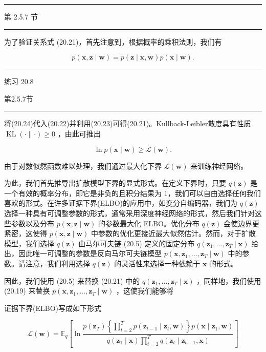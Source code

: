 \documentclass[10pt]{article}
\newcommand{\HRule}{\begin{center}\rule{0.9\linewidth}{0.2mm}\end{center}}
\begin{document}
\HRule

第 2.5.7 节

\HRule

为了验证关系式 (20.21)，首先注意到，根据概率的乘积法则，我们有

\[
p\left( {\mathbf{x},\mathbf{z} \mid  \mathbf{w}}\right)  = p\left( {\mathbf{z} \mid  \mathbf{x},\mathbf{w}}\right) p\left( {\mathbf{x} \mid  \mathbf{w}}\right) . \tag{20.24}
\]

\HRule

练习 20.8

第2.5.7节

\HRule

将(20.24)代入(20.22)并利用(20.23)可得(20.21)。Kullback-Leibler散度具有性质 \(\operatorname{KL}\left( {\cdot \parallel  \cdot  }\right)  \geq  0\) ，由此可推出

\[
\ln p\left( {\mathbf{x} \mid  \mathbf{w}}\right)  \geq  \mathcal{L}\left( \mathbf{w}\right) . \tag{20.25}
\]

由于对数似然函数难以处理，我们通过最大化下界 \(\mathcal{L}\left( \mathbf{w}\right)\) 来训练神经网络。

为此，我们首先推导出扩散模型下界的显式形式。在定义下界时，只要 \(q\left( \mathbf{z}\right)\) 是一个有效的概率分布，即它是非负的且积分结果为 1，我们可以自由选择任何我们喜欢的形式。在许多证据下界(ELBO)的应用中，如变分自编码器，我们为 \(q\left( \mathbf{z}\right)\) 选择一种具有可调整参数的形式，通常采用深度神经网络的形式，然后我们针对这些参数以及分布 \(p\left( {\mathbf{x},\mathbf{z} \mid  \mathbf{w}}\right)\) 的参数最大化 ELBO。优化分布 \(q\left( \mathbf{z}\right)\) 会使边界更紧密，这使得 \(p\left( {\mathbf{x},\mathbf{z} \mid  \mathbf{w}}\right)\) 中参数的优化更接近最大似然估计。然而，对于扩散模型，我们选择 \(q\left( \mathbf{z}\right)\) 由马尔可夫链 (20.5) 定义的固定分布 \(q\left( {{\mathbf{z}}_{1},\ldots ,{\mathbf{z}}_{T} \mid  \mathbf{x}}\right)\) 给出，因此唯一可调整的参数是反向马尔可夫链模型 \(p\left( {\mathbf{x},{\mathbf{z}}_{1},\ldots ,{\mathbf{z}}_{T} \mid  \mathbf{w}}\right)\) 中的参数。请注意，我们利用选择 \(q\left( \mathbf{z}\right)\) 的灵活性来选择一种依赖于 \(\mathbf{x}\) 的形式。

因此，我们使用 (20.5) 来替换 (20.21) 中的 \(q\left( {{\mathbf{z}}_{1},\ldots ,{\mathbf{z}}_{T} \mid  \mathbf{x}}\right)\) ，同样地，我们使用 (20.19) 来替换 \(p\left( {\mathbf{x},{\mathbf{z}}_{1},\ldots ,{\mathbf{z}}_{T} \mid  \mathbf{w}}\right)\) ，这使我们能够将

证据下界(ELBO)写成如下形式

\[
\mathcal{L}\left( \mathbf{w}\right)  = {\mathbb{E}}_{q}\left\lbrack  {\ln \frac{p\left( {\mathbf{z}}_{T}\right) \left\{  {\mathop{\prod }\limits_{{t = 2}}^{T}p\left( {{\mathbf{z}}_{t - 1} \mid  {\mathbf{z}}_{t},\mathbf{w}}\right) }\right\}  p\left( {\mathbf{x} \mid  {\mathbf{z}}_{1},\mathbf{w}}\right) }{q\left( {{\mathbf{z}}_{1} \mid  \mathbf{x}}\right) \mathop{\prod }\limits_{{t = 2}}^{T}q\left( {{\mathbf{z}}_{t} \mid  {\mathbf{z}}_{t - 1},\mathbf{x}}\right) }}\right\rbrack
\]
\end{document}
